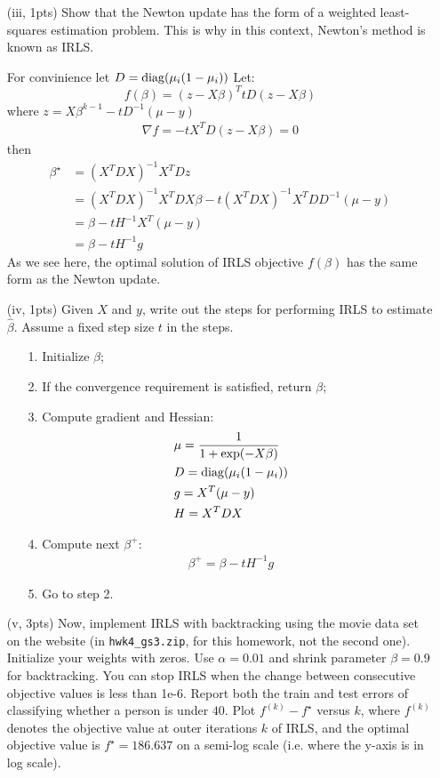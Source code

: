 \documentclass{article}
\theoremstyle{remark}
\theoremstyle{definition}
\newcommand{\diag}{\mathop{\rm diag}}
\begin{document}
\begin{enumerate}[(a)]
\begin{enumerate}
    	\item[(iii, 1pts)] Show that the Newton update has the form of a weighted least-squares estimation problem. This is why in this context, Newton's method is known as IRLS.
    	
    	{
    	\color{blue}
    	For convinience let $D = \diag(\mu_i(1-\mu_i))$
    	Let:
    	\[
    	f(\beta)=(z-X\beta)^T tD(z-X\beta)
    	\]
    	where $z= X\beta^{k-1}-tD^{-1}(\mu-y)$
    	\begin{align*}
    	    \nabla f = -tX^TD(z-X\beta)=0
    	\end{align*}
    	then
    	\begin{align*}
    	    \beta^\star &= (X^TDX)^{-1}X^T D z \\
    	    &=(X^TDX)^{-1}X^T D X\beta - t(X^TDX)^{-1}X^T D D^{-1}(\mu-y) \\
    	    &=\beta - t H^{-1}X^T(\mu-y) \\
    	    &=\beta - t H^{-1}g
    	\end{align*}
    	As we see here, the optimal solution of IRLS objective $f(\beta)$ has the same form as the Newton update.
    	}
    	\item[(iv, 1pts)] Given $X$ and $y$, write out the steps for performing IRLS to estimate $\hat{\beta}$. Assume a fixed step size $t$ in the steps.
    	{
    	\color{blue}
    	\begin{enumerate}
    	    \item[1.] Initialize $\beta$;
    	    \item[2.] If the convergence requirement is satisfied, return $\beta$;
    	    \item[3.] Compute gradient and Hessian:
    	    \begin{align*}
    	        &\mu=\frac{1}{1+\exp(-X\beta)} \\
    	        &D=\diag(\mu_i(1-\mu_i)) \\
    	        &g = X^T(\mu-y) \\
    	        &H = X^T DX
    	    \end{align*}
    	    \item[4.] Compute next $\beta^+$:
    	    \begin{align*}
    	        \beta^+=\beta - t H^{-1}g
    	    \end{align*}
    	    \item[5.] Go to step 2.
    	\end{enumerate}
    	}
        \item[(v, 3pts)] Now, implement IRLS with backtracking using the movie data set on the website (in \texttt{hwk4\_gs3.zip}, for this homework, not the second one). Initialize your weights with zeros. Use $\alpha = 0.01$ and shrink parameter $\beta = 0.9$ for backtracking. You can stop IRLS when the change between consecutive objective values is less than 1e-6. Report both the train and test errors of classifying whether a person is under $40$. Plot $f^{(k)} - f^{\star}$ versus $k$,  where $f^{(k)}$ denotes the objective value at outer iterations $k$ of IRLS, and the optimal objective value is $f^\star = 186.637$ on a semi-log scale (i.e. where the y-axis is in log scale).
        {
        \color{blue}
        
}
\end{enumerate}
\end{enumerate}
\end{document}
